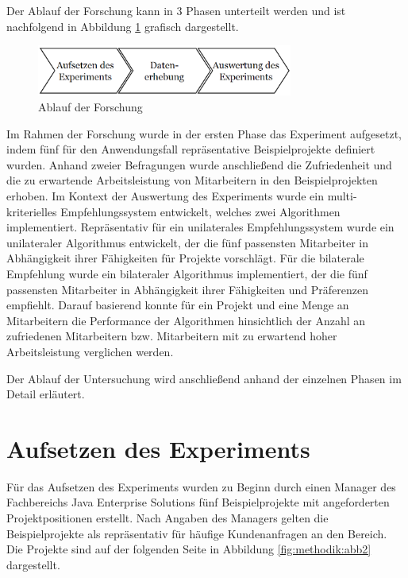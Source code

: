 Der Ablauf der Forschung kann in 3 Phasen unterteilt werden und ist nachfolgend in Abbildung \ref{fig:methodik:abb1} grafisch dargestellt.

\begin{figure}[H]
    \centering
	\includegraphics[width=0.75\textwidth]{gfx/prozess-forschung.png}
	\caption[Ablauf der Forschung]{Ablauf der Forschung}
	\label{fig:methodik:abb1}
\end{figure}

Im Rahmen der Forschung wurde in der ersten Phase das Experiment aufgesetzt, indem fünf für den Anwendungsfall repräsentative Beispielprojekte definiert wurden.
Anhand zweier Befragungen wurde anschließend die Zufriedenheit und die zu erwartende Arbeitsleistung von Mitarbeitern in den Beispielprojekten erhoben.
Im Kontext der Auswertung des Experiments wurde ein multi-kriterielles Empfehlungssystem entwickelt, welches zwei Algorithmen implementiert.
Repräsentativ für ein unilaterales Empfehlungssystem wurde ein unilateraler Algorithmus entwickelt, der die fünf passensten Mitarbeiter in Abhängigkeit ihrer Fähigkeiten für Projekte vorschlägt.
Für die bilaterale Empfehlung wurde ein bilateraler Algorithmus implementiert, der die fünf passensten Mitarbeiter in Abhängigkeit ihrer Fähigkeiten und Präferenzen empfiehlt.
Darauf basierend konnte für ein Projekt und eine Menge an Mitarbeitern die Performance der Algorithmen hinsichtlich der Anzahl an zufriedenen Mitarbeitern bzw. Mitarbeitern mit zu erwartend hoher Arbeitsleistung verglichen werden.

Der Ablauf der Untersuchung wird anschließend anhand der einzelnen Phasen im Detail erläutert.

\section{Aufsetzen des Experiments}
Für das Aufsetzen des Experiments wurden zu Beginn durch einen Manager des Fachbereichs Java Enterprise Solutions fünf Beispielprojekte mit angeforderten Projektpositionen erstellt.
Nach Angaben des Managers gelten die Beispielprojekte als repräsentativ für häufige Kundenanfragen an den Bereich.
Die Projekte sind auf der folgenden Seite in Abbildung \ref{fig:methodik:abb2} dargestellt.


